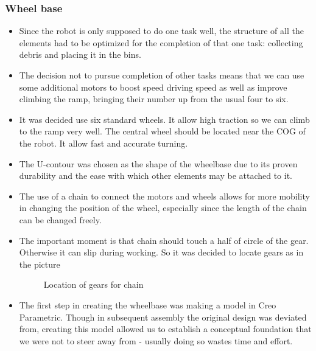 \subsubsection{Wheel base}
\begin{itemize}
\item Since the robot is only supposed to do one task well, the structure of all the elements had to be optimized for the completion of that one task: collecting debris and placing it in the bins.

\item The decision not to pursue completion of other tasks means that we can use some additional motors to boost speed driving speed as well as improve climbing the ramp, bringing their number up from the usual four to six.

\item It was decided use six standard wheels. It allow high traction so we can climb to the ramp very well. The central wheel should be located near the COG of the robot. It allow fast and accurate turning. 

\item The U-contour was chosen as the shape of the wheelbase due to its proven durability and the ease with which other elements may be attached to it.

\item The use of a chain to connect the motors and wheels allows for more mobility in changing the position of the wheel, especially since the length of the chain can be changed freely.

\item The important moment is that chain should touch a half of circle of the gear. Otherwise it can slip during working. So it was decided to locate gears as in the picture
\begin{figure}[H]
	\begin{minipage}[h]{1\linewidth}
		\caption{Location of gears for chain}
	\end{minipage}
\end{figure} 



\item The first step in creating the wheelbase was making a model in Creo Parametric. Though in subsequent assembly the original design was deviated from, creating this model allowed us to establish a conceptual foundation that we were not to steer away from - usually doing so wastes time and effort.


\end{itemize}
